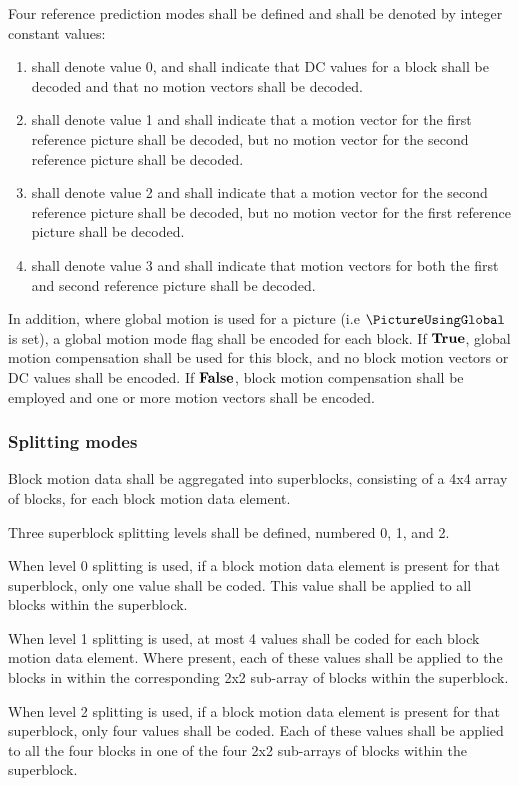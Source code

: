 Four reference prediction modes shall be defined and shall be denoted by integer
constant values: 
\begin{enumerate}
\item \Intra shall denote value 0, and shall indicate that DC values for a block
shall be decoded and that no motion vectors shall be decoded.
\item  \RefOneOnly shall denote value 1 and shall indicate that a motion vector
for the first reference picture shall be decoded, but no motion vector for the second
reference picture shall be decoded.
\item  \RefTwoOnly shall denote value 2 and shall indicate that a motion vector
for the second reference picture shall be decoded, but no motion vector for the first
reference picture shall be decoded.
\item  \RefOneAndTwo shall denote value 3 and shall indicate that motion vectors
for both the first and second reference picture shall be decoded.
\end{enumerate}

In addition, where global motion is used for a picture (i.e $\PictureUsingGlobal$ is set), 
a global motion mode flag shall be encoded for each block. If $\text{\bf{True}}$, global motion
compensation shall be used for this block, and no block motion vectors or DC values
shall be encoded. If $\text{\bf{False}}$, block motion compensation shall be employed and
one or more motion vectors shall be encoded.

\subsubsection{Splitting modes}

Block motion data shall be aggregated into superblocks, consisting of a 4x4 array
of blocks, for each block motion data element. 

Three superblock splitting levels shall be defined, numbered 0, 1, and 2. 

When level 0 splitting is used, if a block motion data element is
present for that superblock, only one value shall be coded. This value shall be 
applied to all blocks within the superblock.

When level 1 splitting is used, at most 4 values shall be coded for each
block motion data element. Where present, each of these values
shall be applied to the blocks in within the corresponding 2x2 sub-array of blocks
within the superblock.

When level 2 splitting is used, if a block motion data element is
present for that superblock, only four values shall be coded. Each of these values
shall be applied to all the four blocks in one of the four 2x2 sub-arrays of blocks
within the superblock.

